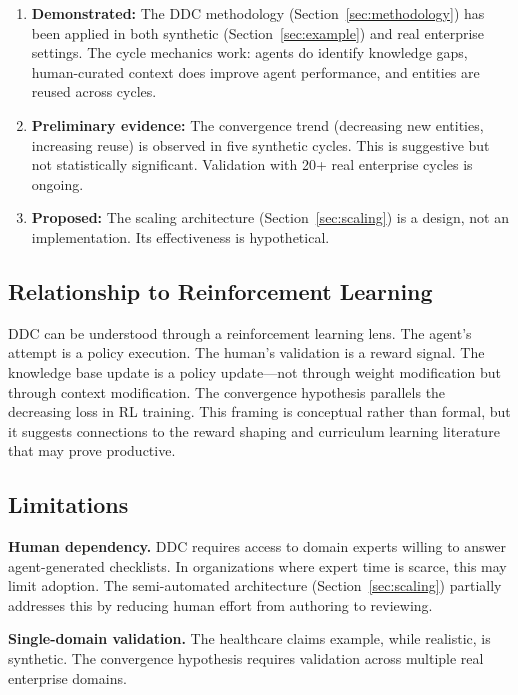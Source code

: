 \documentclass[11pt,a4paper]{article}
\begin{document}
\begin{enumerate}
  \item \textbf{Demonstrated:} The DDC methodology (Section~\ref{sec:methodology}) has been applied in both synthetic (Section~\ref{sec:example}) and real enterprise settings. The cycle mechanics work: agents do identify knowledge gaps, human-curated context does improve agent performance, and entities are reused across cycles.

  \item \textbf{Preliminary evidence:} The convergence trend (decreasing new entities, increasing reuse) is observed in five synthetic cycles. This is suggestive but not statistically significant. Validation with 20+ real enterprise cycles is ongoing.

  \item \textbf{Proposed:} The scaling architecture (Section~\ref{sec:scaling}) is a design, not an implementation. Its effectiveness is hypothetical.
\end{enumerate}

\subsection{Relationship to Reinforcement Learning}

DDC can be understood through a reinforcement learning lens. The agent's attempt is a policy execution. The human's validation is a reward signal. The knowledge base update is a policy update---not through weight modification but through context modification. The convergence hypothesis parallels the decreasing loss in RL training. This framing is conceptual rather than formal, but it suggests connections to the reward shaping and curriculum learning literature that may prove productive.

\subsection{Limitations}

\textbf{Human dependency.} DDC requires access to domain experts willing to answer agent-generated checklists. In organizations where expert time is scarce, this may limit adoption. The semi-automated architecture (Section~\ref{sec:scaling}) partially addresses this by reducing human effort from authoring to reviewing.

\textbf{Single-domain validation.} The healthcare claims example, while realistic, is synthetic. The convergence hypothesis requires validation across multiple real enterprise domains.
\end{document}
